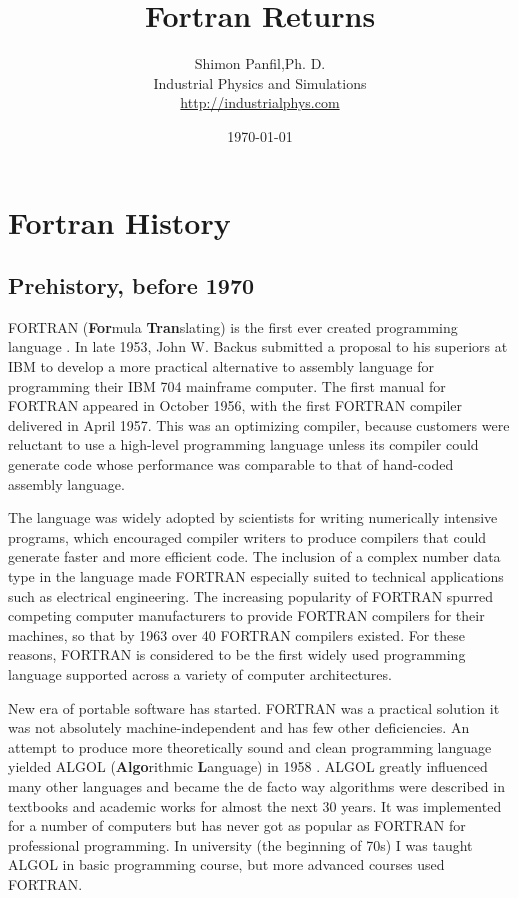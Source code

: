 \documentclass[a4paper]{article}
\title {Fortran Returns}
\author{Shimon Panfil,Ph. D. \\
    Industrial Physics and Simulations \\
    \href{http://industrialphys.com}{http://industrialphys.com}
}
\date{\today}
\begin{document}
\maketitle
\section{Fortran History}
\subsection{Prehistory, before 1970}
FORTRAN ({\bf For}mula {\bf Tran}slating) is the first ever created programming language \cite{wiki-fortran}.
In late 1953, John W. Backus submitted a proposal to his superiors at IBM to develop a more practical alternative to assembly language for programming their IBM 704 mainframe computer. 
 The first manual for FORTRAN appeared in October 1956, with the first FORTRAN compiler delivered in April 1957. This was an optimizing compiler, because customers were reluctant to use a high-level programming language unless its compiler could generate code whose performance was comparable to that of hand-coded assembly language.

The language was widely adopted by scientists for writing numerically intensive programs, which encouraged compiler writers to produce compilers that could generate faster and more efficient code. The inclusion of a complex number data type in the language made FORTRAN especially suited to technical applications such as electrical engineering. The increasing popularity of FORTRAN spurred competing computer manufacturers to provide FORTRAN compilers for their machines, so that by 1963 over 40 FORTRAN compilers existed. For these reasons, FORTRAN is considered to be the first widely used programming language supported across a variety of computer architectures.

New era of portable software has started. FORTRAN was a practical solution it was not absolutely machine-independent and has few other deficiencies. An attempt to produce more theoretically sound and clean programming language yielded ALGOL ({\bf Algo}rithmic {\bf L}anguage) in 1958 \cite {wiki-algol}. ALGOL greatly influenced many other languages and became the de facto way algorithms were described in textbooks and academic works for almost the next 30 years. It was implemented for a number of computers but has never got as popular as FORTRAN for professional programming. In university (the beginning of 70s) I was taught ALGOL in basic programming course, but more advanced courses used FORTRAN.  
 
\end{document}
